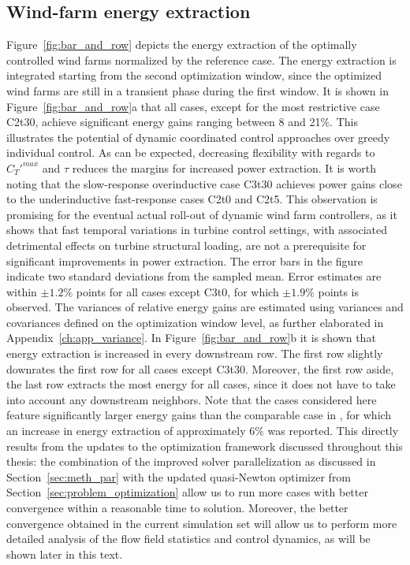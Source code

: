 \pagebreak


\subsection{Wind-farm energy extraction}\label{sec:opt_ind_energy}

Figure~\ref{fig:bar_and_row} depicts the energy extraction of the optimally controlled wind farms normalized by the reference case. The energy extraction is integrated starting from the second optimization window, since the optimized wind farms are still in a transient phase during the first window. It is shown in Figure~\ref{fig:bar_and_row}a that all cases, except for the most restrictive case C2t30, achieve significant energy gains ranging between 8 and 21\%. This illustrates the potential of dynamic coordinated control approaches over greedy individual control. As can be expected, decreasing flexibility with regards to $C_T'^{max}$ and $\tau$ reduces the margins for increased power extraction. It is worth noting that the slow-response overinductive case C3t30 achieves power gains close to the underinductive fast-response cases C2t0 and C2t5. This observation is promising for the eventual actual roll-out of dynamic wind farm controllers, as it shows that fast temporal variations in turbine control settings, with associated detrimental effects on turbine structural loading, are not a prerequisite for significant improvements in power extraction. The error bars in the figure indicate two standard deviations from the sampled mean. Error estimates are within $\pm 1.2$\% points for all cases except C3t0, for which $\pm 1.9$\% points is observed. The variances of relative energy gains are estimated using variances and covariances defined on the optimization window level, as further elaborated in Appendix~\ref{ch:app_variance}. In Figure~\ref{fig:bar_and_row}b it is shown that energy extraction is increased in every downstream row. The first row slightly downrates the first row for all cases except C3t30. Moreover, the first row aside, the last row extracts the most energy for all cases, since it does not have to take into account any downstream neighbors. Note that the cases considered here feature significantly larger energy gains than the comparable case in \cite{goit2016optimal}, for which an increase in energy extraction of approximately 6\% was reported. This directly results from the updates to the optimization framework discussed throughout this thesis: the combination of the improved solver parallelization as discussed in Section~\ref{sec:meth_par} with the updated quasi-Newton optimizer from Section~\ref{sec:problem_optimization} allow us to run more cases with better convergence within a reasonable time to solution. Moreover, the better convergence obtained in the current simulation set will allow us to perform more detailed analysis of the flow field statistics and control dynamics, as will be shown later in this text.

